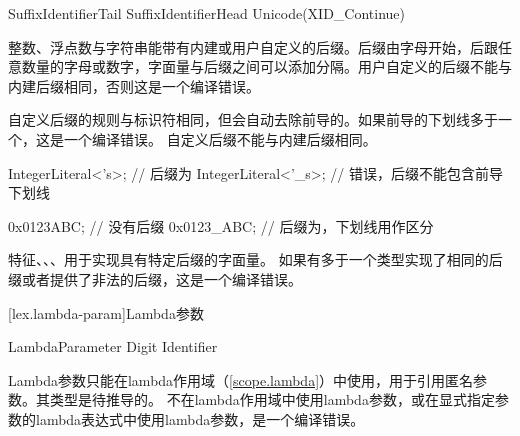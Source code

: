 \begin{bnf}{SuffixIdentifierTail}
    SuffixIdentifierHead \br
    Unicode(XID_Continue)
\end{bnf}

\pnum
整数、浮点数与字符串能带有内建或用户自定义的后缀。后缀由字母开始，后跟任意数量的字母或数字，字面量与后缀之间可以添加\tcode{_}分隔。用户自定义的后缀不能与内建后缀相同，否则这是一个编译错误。

\pnum
自定义后缀的规则与标识符相同，但会自动去除前导的\tcode{_}。如果前导的下划线多于一个，这是一个编译错误。
自定义后缀不能与内建后缀相同。

\enterexample
\begin{codeblock}
IntegerLiteral<'s>; // 后缀为
IntegerLiteral<'_s>; // 错误，后缀不能包含前导下划线

0x0123ABC; // 没有后缀
0x0123_ABC; // 后缀为，下划线用作区分
\end{codeblock}
\exitexample

\pnum
特征、、、用于实现具有特定后缀的字面量。
如果有多于一个类型实现了相同的后缀或者提供了非法的后缀，这是一个编译错误。

[lex.lambda-param]{Lambda参数}

\begin{bnf}{LambdaParameter}
    \terminal{\$} Digit\bnfp \br
    \terminal{\$} Identifier
\end{bnf}

\pnum
Lambda参数只能在lambda作用域（\ref{scope.lambda}）中使用，用于引用匿名参数。其类型是待推导的。
不在lambda作用域中使用lambda参数，或在显式指定参数的lambda表达式中使用lambda参数，是一个编译错误。